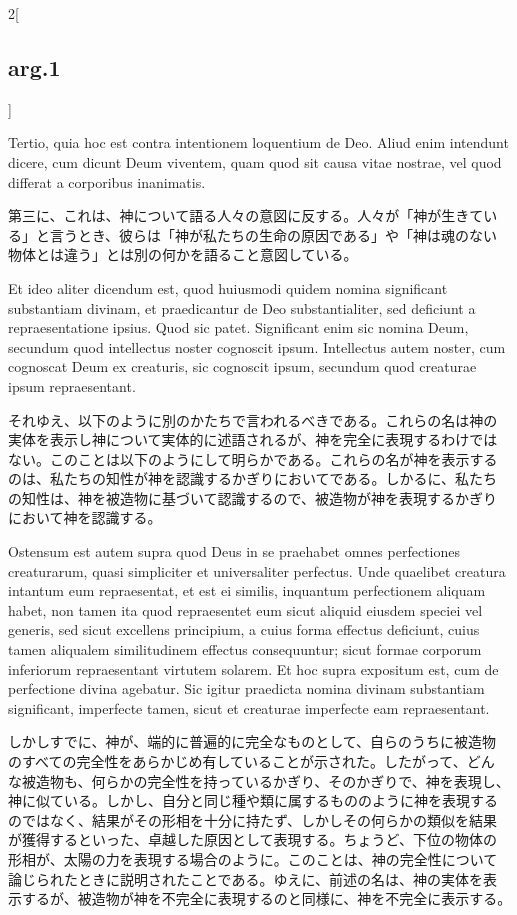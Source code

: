 \documentclass[paper=a4paper,fontsize=10pt,jafontsize=9pt,titlepage]{jlreq}
\begin{document}
\begin{paracol}{2}[\subsection{arg.1}]
\switchcolumn*

Tertio, quia hoc est contra intentionem loquentium de Deo. Aliud enim
intendunt dicere, cum dicunt Deum viventem, quam quod sit causa vitae
nostrae, vel quod differat a corporibus inanimatis.

\switchcolumn

第三に、これは、神について語る人々の意図に反する。人々が「神が生きてい
る」と言うとき、彼らは「神が私たちの生命の原因である」や「神は魂のない
物体とは違う」とは別の何かを語ること意図している。

\switchcolumn*

Et ideo aliter dicendum est, quod huiusmodi quidem nomina significant
substantiam divinam, et praedicantur de Deo substantialiter, sed
deficiunt a repraesentatione ipsius. Quod sic patet. Significant enim
sic nomina Deum, secundum quod intellectus noster cognoscit
ipsum. Intellectus autem noster, cum cognoscat Deum ex creaturis, sic
cognoscit ipsum, secundum quod creaturae ipsum repraesentant.

\switchcolumn

それゆえ、以下のように別のかたちで言われるべきである。これらの名は神の
実体を表示し神について実体的に述語されるが、神を完全に表現するわけでは
ない。このことは以下のようにして明らかである。これらの名が神を表示する
のは、私たちの知性が神を認識するかぎりにおいてである。しかるに、私たち
の知性は、神を被造物に基づいて認識するので、被造物が神を表現するかぎり
において神を認識する。

\switchcolumn*

Ostensum est autem supra quod Deus in se praehabet omnes perfectiones
creaturarum, quasi simpliciter et universaliter perfectus. Unde
quaelibet creatura intantum eum repraesentat, et est ei similis,
inquantum perfectionem aliquam habet, non tamen ita quod repraesentet
eum sicut aliquid eiusdem speciei vel generis, sed sicut excellens
principium, a cuius forma effectus deficiunt, cuius tamen aliqualem
similitudinem effectus consequuntur; sicut formae corporum inferiorum
repraesentant virtutem solarem. Et hoc supra expositum est, cum de
perfectione divina agebatur. Sic igitur praedicta nomina divinam
substantiam significant, imperfecte tamen, sicut et creaturae
imperfecte eam repraesentant.

\switchcolumn

しかしすでに、神が、端的に普遍的に完全なものとして、自らのうちに被造物
のすべての完全性をあらかじめ有していることが示された。したがって、どん
な被造物も、何らかの完全性を持っているかぎり、そのかぎりで、神を表現し、
神に似ている。しかし、自分と同じ種や類に属するもののように神を表現する
のではなく、結果がその形相を十分に持たず、しかしその何らかの類似を結果
が獲得するといった、卓越した原因として表現する。ちょうど、下位の物体の
形相が、太陽の力を表現する場合のように。このことは、神の完全性について
論じられたときに説明されたことである。ゆえに、前述の名は、神の実体を表
示するが、被造物が神を不完全に表現するのと同様に、神を不完全に表示する。


\end{paracol}
\end{document}
